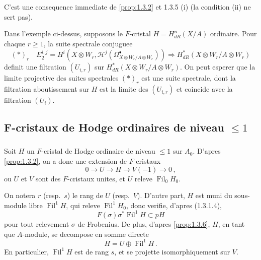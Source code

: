 \documentclass[12pt,a4paper]{article}
\theoremstyle{plain}
\theoremstyle{definition}
\theoremstyle{remark}
\DeclareMathOperator{\Fil}{Fil}
\begin{document}
C'est une consequence immediate de \ref{prop:1.3.2} et 1.3.5 (i) (la condition (ii) ne sert pas).

Dans l'exemple ci-dessus, supposons le $F$-cristal $H = H_{dR}^n(X/A)$ ordinaire. Pour chaque $r \geq 1$, la suite spectrale conjuguee
\[
(*)_{r}\quad E_2^{i,j} = H^i(X \otimes W_r, \mathcal{H}^j(\Omega_{X \otimes W_r/A \otimes W_r}^\bullet)) \Longrightarrow H_{dR}^*(X \otimes W_r/A \otimes W_r)
\]
definit une filtration $(U_{i,r})$ sur $H_{dR}^*(X \otimes W_r/A \otimes W_r)$. On peut esperer que la limite projective des suites spectrales $(*)_r$ est une suite spectrale, dont la filtration aboutissement sur $H$ est la limite des $(U_{i,r})$ et coincide avec la filtration $(U_i)$.

\subsection{F-cristaux de Hodge ordinaires de niveau $\leq 1$}

\subsubsection{}

Soit $H$ un $F$-cristal de Hodge ordinaire de niveau $\leq 1$ sur $A_0$. D'apres \ref{prop:1.3.2}, on a donc une extension de $F$-cristaux
\begin{equation}\label{eq:1.4.1.1}
0 \longrightarrow U \longrightarrow H \longrightarrow V(-1) \longrightarrow 0\,,
\end{equation}
ou $U$ et $V$ sont des $F$-cristaux unites, et $U$ releve $\Fil_0H_0$.

On notera $r$ (resp.\ $s$) le rang de $U$ (resp.\ $V$). D'autre part, $H$ est muni du sous-module libre $\Fil^1H$, qui releve $\Fil^1H_0$, donc verifie, d'apres (1.3.1.4),
\begin{equation}\label{eq:1.4.1.2}
F(\sigma)\sigma^*\Fil^1H \subset pH
\end{equation}
pour tout relevement $\sigma$ de Frobenius. De plus, d'apres \ref{prop:1.3.6}, $H$, en tant que $A$-module, se decompose en somme directe
\begin{equation}\label{eq:1.4.1.3}
H = U \oplus \Fil^1H\,.\end{equation}
En particulier, $\Fil^1H$ est de rang $s$, et se projette isomorphiquement sur $V$.
\end{document}
